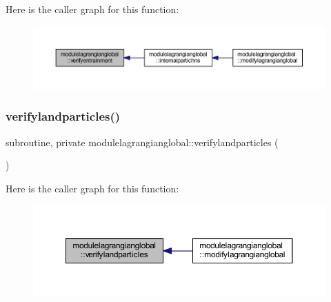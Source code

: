 Here is the caller graph for this function\+:\nopagebreak
\begin{figure}[H]
\begin{center}
\leavevmode
\includegraphics[width=350pt]{namespacemodulelagrangianglobal_ad6565cf35585f706dfd2fa59deaed3b4_icgraph}
\end{center}
\end{figure}
\mbox{\label{namespacemodulelagrangianglobal_ac120fed4d0c01e0966e67e65fb6d05fc}} 
\subsubsection{\texorpdfstring{verifylandparticles()}{verifylandparticles()}}
{\footnotesize\ttfamily subroutine, private modulelagrangianglobal\+::verifylandparticles (\begin{DoxyParamCaption}{ }\end{DoxyParamCaption})\hspace{0.3cm}{\ttfamily [private]}}

Here is the caller graph for this function\+:\nopagebreak
\begin{figure}[H]
\begin{center}
\leavevmode
\includegraphics[width=350pt]{namespacemodulelagrangianglobal_ac120fed4d0c01e0966e67e65fb6d05fc_icgraph}
\end{center}
\end{figure}
\mbox{\label{namespacemodulelagrangianglobal_a665e00ca13f06e06edf9476f18ec2b58}} 
